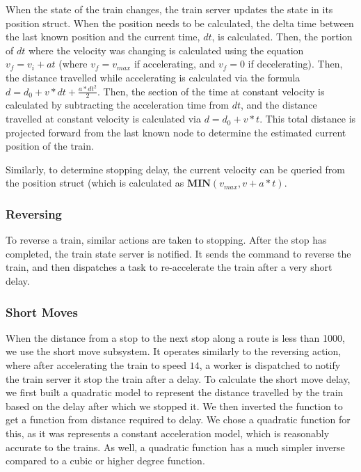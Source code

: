 \documentclass{article}
\begin{document}
When the state of the train changes, the train server updates the state in its position struct.
When the position needs to be calculated, the delta time between the last known position and the current time, $dt$, is calculated.
Then, the portion of $dt$ where the velocity was changing is calculated using the equation $v_f = v_i + at$ (where $v_f = v_{max}$ if accelerating, and $v_f = 0$ if decelerating). 
Then, the distance travelled while accelerating is calculated via the formula $d = d_0 + v*dt + \frac{a *dt^2}{2}$. 
Then, the section of the time at constant velocity is calculated by subtracting the acceleration time from $dt$, and the distance travelled at constant velocity is calculated via $d = d_0 + v*t$. 
This total distance is projected forward from the last known node to determine the estimated current position of the train.

Similarly, to determine stopping delay, the current velocity can be queried from the position struct (which is calculated as $\textbf{MIN}(v_{max}, v + a*t)$.

\subsubsection{Reversing}
To reverse a train, similar actions are taken to stopping. After the stop has completed, the train state server is notified. It sends the command to reverse the train, and then dispatches a task to re-accelerate the train after a very short delay.

\subsubsection{Short Moves} 
When the distance from a stop to the next stop along a route is less than 1000, we use the short move subsystem. It operates similarly to the reversing action, where after accelerating the train to speed $14$, a worker is dispatched to notify the train server it stop the train after a delay.
To calculate the short move delay, we first built a quadratic model to represent the distance travelled by the train based on the delay after which we stopped it. We then inverted the function to get a function from distance required to delay.
We chose a quadratic function for this, as it was represents a constant acceleration model, which is reasonably accurate to the trains. As well, a quadratic function has a much simpler inverse compared to a cubic or higher degree function. 
\end{document}
